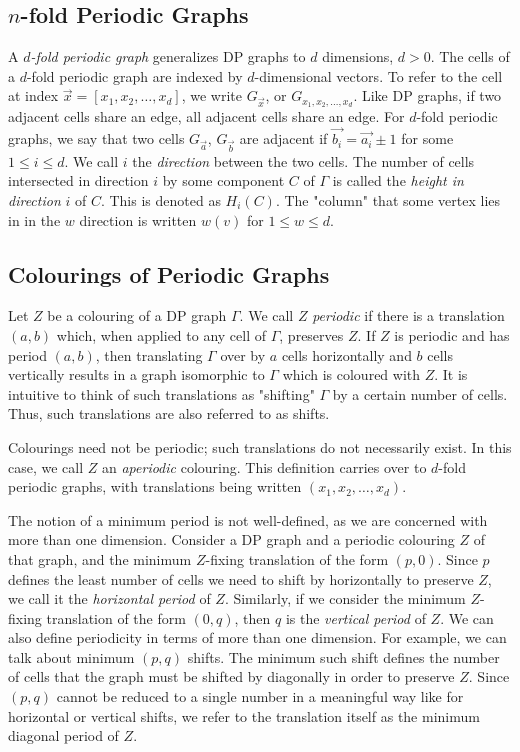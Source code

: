 \documentclass[letterpaper]{article}
\begin{document}
\subsection{$n$-fold Periodic Graphs}
A $d$\emph{-fold periodic graph} generalizes DP graphs to $d$ dimensions, $d > 0$.
The cells of a $d$-fold periodic graph are indexed by $d$-dimensional vectors.
To refer to the cell at index $\vec{x} = [ x_1, x_2, \ldots, x_d ]$, we write $G_{\vec{x}}$, or $G_{x_1, x_2, \ldots, x_d}$.
Like DP graphs, if two adjacent cells share an edge, all adjacent cells share an edge.
For $d$-fold periodic graphs, we say that two cells $G_{\vec{a}}$, $G_{\vec{b}}$ are adjacent if $\vec{b_i} = \vec{a_i} \pm 1$ for some $1 \leq i \leq d$.
We call $i$ the \emph{direction} between the two cells.
The number of cells intersected in direction $i$ by some component $C$ of $\Gamma$ is called the \emph{height in direction } $i$ of $C$.
This is denoted as $H_{i}(C)$.
The "column" that some vertex lies in in the $w$ direction is written $w(v)$ for $1 \leq w \leq d$.

\subsection{Colourings of Periodic Graphs}
Let $Z$ be a colouring of a DP graph $\Gamma$.
We call $Z$ \emph{periodic} if there is a translation $(a,b)$ which, when applied to any cell of $\Gamma$, preserves $Z$.
If $Z$ is periodic and has period $(a,b)$, then translating $\Gamma$ over by $a$ cells horizontally and $b$ cells vertically results in a graph isomorphic to $\Gamma$ which is coloured with $Z$.
It is intuitive to think of such translations as "shifting" $\Gamma$ by a certain number of cells.
Thus, such translations are also referred to as shifts.

Colourings need not be periodic; such translations do not necessarily exist.
In this case, we call $Z$ an \emph{aperiodic} colouring.
This definition carries over to $d$-fold periodic graphs, with translations being written $(x_1, x_2, \ldots, x_d)$.

The notion of a minimum period is not well-defined, as we are concerned with more than one dimension.
Consider a DP graph and a periodic colouring $Z$ of that graph, and the minimum $Z$-fixing translation of the form $(p,0)$.
Since $p$ defines the least number of cells we need to shift by horizontally to preserve $Z$, we call it the \emph{horizontal period} of $Z$.
Similarly, if we consider the minimum $Z$-fixing translation of the form $(0,q)$, then $q$ is the \emph{vertical period} of $Z$.
We can also define periodicity in terms of more than one dimension.
For example, we can talk about minimum $(p,q)$ shifts.
The minimum such shift defines the number of cells that the graph must be shifted by diagonally in order to preserve $Z$.
Since $(p,q)$ cannot be reduced to a single number in a meaningful way like for horizontal or vertical shifts, we refer to the translation itself as the minimum diagonal period of $Z$.
\end{document}
